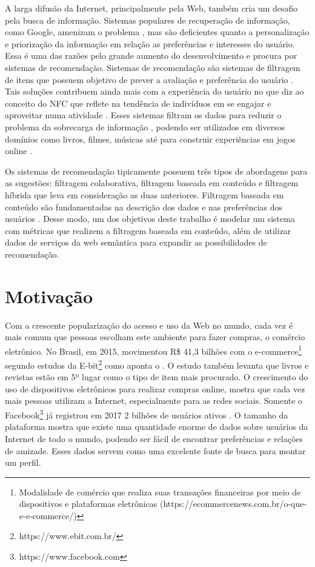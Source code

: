 A larga difusão da Internet, principalmente pela Web, também cria um desafio pela busca de informação. Sistemas populares de recuperação de informação, como Google, amenizam o problema \citep{ISINKAYE2015261}, mas são deficientes quanto a personalização e priorização da informação em relação as preferências e interesses do usuário. Essa é uma das razões pelo grande aumento do desenvolvimento e procura por sistemas de recomendação. Sistemas de recomendação são sistemas de filtragem de itens que possuem objetivo de prever a avaliação e preferência do usuário \citep{Ricci2011}. Tais soluções contribuem ainda mais com a experiência do usuário no que diz ao conceito do \ac{NFC} que reflete na tendência de indivíduos em se engajar e aproveitar numa atividade \citep{Mykolas:2015a}. Esses sistemas filtram os dados para reduzir o problema da sobrecarga de informação \citep{Konstan2012}, podendo ser utilizados em diversos domínios como livros, filmes, músicas até para construir experiências em jogos online \citep{Activision:Glixel}.

Os sistemas de recomendação tipicamente possuem três tipos de abordagens para as sugestões: filtragem colaborativa, filtragem baseada em conteúdo e filtragem híbrida que leva em consideração as duas anteriores. Filtragem baseada em conteúdo são fundamentadas na descrição dos dados e nas preferências dos usuários \citep{Aggarwal2016}. Desse modo, um dos objetivos deste trabalho é modelar um sistema com métricas que realizem a filtragem baseada em conteúdo, além de utilizar dados de serviços da web semântica para expandir as possibilidades de recomendação.

\section{Motivação}
Com a crescente popularização do acesso e uso da Web no mundo, cada vez é mais comum que pessoas escolham este ambiente para fazer compras, o comércio eletrônico. No Brasil, em 2015, movimentou R\$ 41,3 bilhões com o e-commerce\footnote{Modalidade de comércio que realiza suas transações financeiras por meio de dispositivos e plataformas eletrônicas (https://ecommercenews.com.br/o-que-e-e-commerce/)} segundo estudos da E-bit\footnote{https://www.ebit.com.br/} como aponta o \cite{Sebrae:2016}. O estudo também levanta que livros e revistas estão em 5º lugar como o tipo de item mais procurado. O crescimento do uso de dispositivos eletrônicos para realizar compras online, mostra que cada vez mais pessoas utilizam a Internet, especialmente para as redes sociais. Somente o Facebook\footnote{https://www.facebook.com} já registrou em 2017 2 bilhões de usuários ativos \citep{Statista:2017}. O tamanho da plataforma mostra que existe uma quantidade enorme de dados sobre usuários da Internet de todo o mundo, podendo ser fácil de encontrar preferências e relações de amizade. Esses dados servem como uma excelente fonte de busca para montar um perfil.

